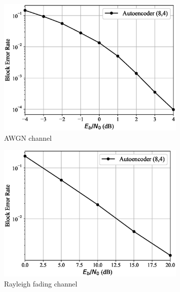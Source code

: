 \begin{figure}[!tp]
	\center
	\begin{subfigure}{0.3\textwidth}
		\includegraphics[width=\linewidth]{figs/autoencoder_bler_awgn}
		\caption{AWGN channel}
	\end{subfigure}
	\begin{subfigure}{0.3\textwidth}
		\includegraphics[width=\linewidth]{figs/autoencoder_bler_rayleigh}
		\caption{Rayleigh fading channel}	
	\end{subfigure}
	\begin{subfigure}{0.3\textwidth}

\end{subfigure}
\end{figure}

